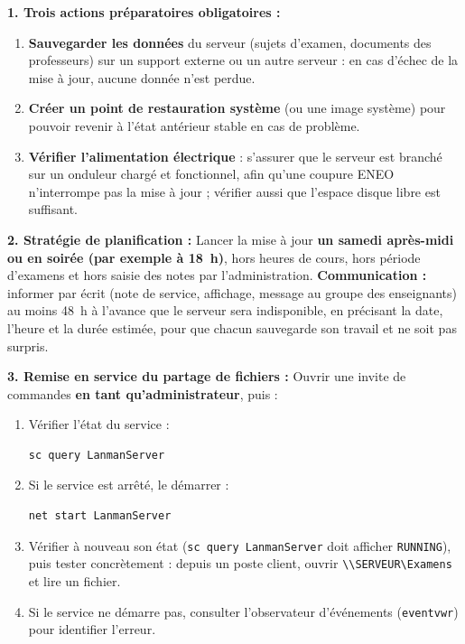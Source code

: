 \documentclass[11pt]{article}
\begin{document}
\begin{corrige}
\textbf{1. Trois actions préparatoires obligatoires :}
\begin{enumerate}
    \item \textbf{Sauvegarder les données} du serveur (sujets d'examen, documents des professeurs) sur un support externe ou un autre serveur : en cas d'échec de la mise à jour, aucune donnée n'est perdue.
    \item \textbf{Créer un point de restauration système} (ou une image système) pour pouvoir revenir à l'état antérieur stable en cas de problème.
    \item \textbf{Vérifier l'alimentation électrique} : s'assurer que le serveur est branché sur un onduleur chargé et fonctionnel, afin qu'une coupure ENEO n'interrompe pas la mise à jour ; vérifier aussi que l'espace disque libre est suffisant.
\end{enumerate}

\textbf{2. Stratégie de planification :}
Lancer la mise à jour \textbf{un samedi après-midi ou en soirée (par exemple à 18~h)}, hors heures de cours, hors période d'examens et hors saisie des notes par l'administration. \textbf{Communication :} informer par écrit (note de service, affichage, message au groupe des enseignants) au moins 48~h à l'avance que le serveur sera indisponible, en précisant la date, l'heure et la durée estimée, pour que chacun sauvegarde son travail et ne soit pas surpris.

\textbf{3. Remise en service du partage de fichiers :}
Ouvrir une invite de commandes \textbf{en tant qu'administrateur}, puis :
\begin{enumerate}
    \item Vérifier l'état du service :
\begin{lstlisting}[language=bash]
sc query LanmanServer
\end{lstlisting}
    \item Si le service est arrêté, le démarrer :
\begin{lstlisting}[language=bash]
net start LanmanServer
\end{lstlisting}
    \item Vérifier à nouveau son état (\texttt{sc query LanmanServer} doit afficher \texttt{RUNNING}), puis tester concrètement : depuis un poste client, ouvrir \texttt{\textbackslash\textbackslash SERVEUR\textbackslash Examens} et lire un fichier.
    \item Si le service ne démarre pas, consulter l'observateur d'événements (\texttt{eventvwr}) pour identifier l'erreur.
\end{enumerate}


\end{corrige}
\end{document}
